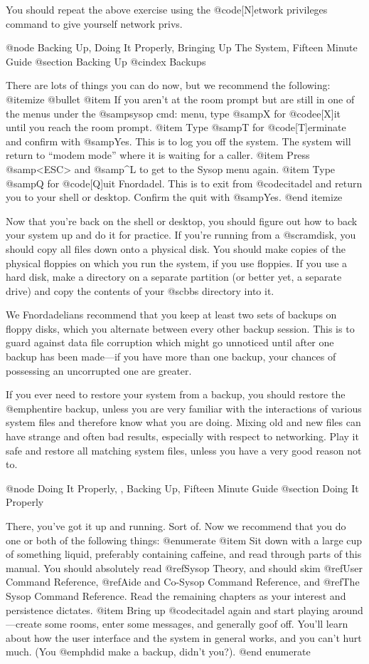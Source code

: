You should repeat the above exercise using the @code{[N]etwork privileges}
command to give yourself network privs.

@node Backing Up, Doing It Properly, Bringing Up The System, Fifteen Minute Guide
@section Backing Up
@cindex Backups

There are lots of things you can do now, but we recommend the following:
@itemize @bullet
@item
If you aren't at the room prompt but are still in one of the menus under the
@samp{sysop cmd:} menu, type @samp{X} for @code{e[X]it} until you
reach the room prompt.
@item
Type @samp{T} for @code{[T]erminate} and confirm with @samp{Yes}.  This is to
log you off the system.  The system will return to ``modem mode'' where it
is waiting for a caller.
@item
Press @samp{<ESC>} and @samp{^L} to get to the Sysop menu again.
@item
Type @samp{Q} for @code{[Q]uit Fnordadel}.  This is to exit from @code{citadel}
and return you to your shell or desktop.  Confirm the quit with @samp{Yes}.
@end itemize

Now that you're back on the shell or desktop, you should figure out how to
back your system up and do it for practice.  If you're running from a @sc{ram}disk,
you should copy all files down onto a physical disk.  You should make copies
of the physical floppies on which you run the system, if you use floppies.
If you use a hard disk, make a directory on a separate partition (or better
yet, a separate drive) and copy the contents of your @sc{bbs} directory into it.

We Fnordadelians recommend that you keep at least two sets of backups on
floppy disks, which you alternate between every other backup session.  This
is to guard against data file corruption which might go unnoticed until after
one backup has been made---if you have more than one backup, your chances
of possessing an uncorrupted one are greater.

If you ever need to restore your system from a backup, you should restore
the @emph{entire} backup, unless you are very familiar with the interactions of
various system files and therefore know what you are doing.  Mixing old and new
files can have strange and often bad results, especially with respect to
networking.  Play it safe and restore all matching system files, unless you
have a very good reason not to.

@node Doing It Properly,  , Backing Up, Fifteen Minute Guide
@section Doing It Properly

There, you've got it up and running.  Sort of.  Now we recommend
that you do one or both of the following things:
@enumerate
@item
Sit down with a large cup of something liquid, preferably containing caffeine,
and read through parts of this manual.  You should absolutely read
@ref{Sysop Theory}, and should skim @ref{User Command Reference},
@ref{Aide and Co-Sysop Command Reference}, and
@ref{The Sysop Command Reference}.
Read the remaining chapters as your interest and
persistence dictates.
@item
Bring up @code{citadel} again and start playing around---create some rooms,
enter some messages, and generally goof off.  You'll learn about how the
user interface and the system in general works, and you can't hurt much.
(You @emph{did} make a backup, didn't you?).
@end enumerate

